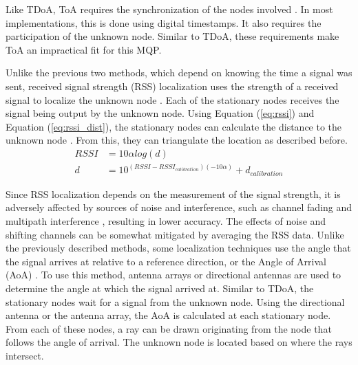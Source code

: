 Like TDoA, ToA requires the synchronization of the nodes involved \cite{local_conf}. In most implementations, this is done using digital timestamps. It also requires the participation of the unknown node. Similar to TDoA, these requirements make ToA an impractical fit for this MQP. \par

Unlike the previous two methods, which depend on knowing the time a signal was sent, received signal strength (RSS) localization uses the strength of a received signal to localize the unknown node \cite{local_conf}. Each of the stationary nodes receives the signal being output by the unknown node. Using Equation (\ref{eq:rssi}) and Equation (\ref{eq:rssi_dist}), the stationary nodes can calculate the distance to the unknown node \cite{rss_calc}. From this, they can triangulate the location as described before.
\begin{align}
\label{eq:rssi} RSSI &= 10\alpha log(d) \\ 
\label{eq:rssi_dist} d &= 10^{(RSSI-RSSI_{calibration})(-10\alpha)} + d_{calibration}
\end{align}
\par
Since RSS localization depends on the measurement of the signal strength, it is adversely affected by sources of noise and interference, such as channel fading and multipath interference \cite{local_conf}, resulting in lower accuracy. The effects of noise and shifting channels can be somewhat mitigated by averaging the RSS data.
Unlike the previously described methods, some localization techniques use the angle that the signal arrives at relative to a reference direction, or the Angle of Arrival (AoA) \cite{local_aoa}. To use this method, antenna arrays or directional antennas are used to determine the angle at which the signal arrived at. Similar to TDoA, the stationary nodes wait for a signal from the unknown node. Using the directional antenna or the antenna array, the AoA is calculated at each stationary node. From each of these nodes, a ray can be drawn originating from the node that follows the angle of arrival. The unknown node is located based on where the rays intersect.

